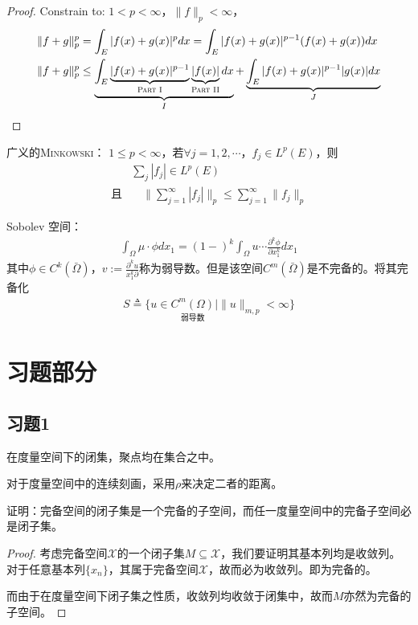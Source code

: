 \begin{proof}
    Constrain to: $1<p<\infty$，$\|f\|_p<\infty$，
    \begin{align*}
        \|f+g\|_p^p &= \int_E |f(x) + g(x)|^p dx = \int_E |f(x) + g(x)|^{p-1}(f(x) + g(x))dx \\
        \|f+g\|_p^p &\le \underbrace{\int_E \underbrace{|f(x)+g(x)|^{p-1}}\limits_{\textsc{Part I}} \underbrace{|f(x)|}\limits_{\textsc{Part II}} dx}\limits_{I} + \underbrace{\int_{E} |f(x) + g(x)|^{p-1} |g(x)| dx}\limits_{J}
    \end{align*}
\end{proof}

\begin{theorem}
    \textsc{广义的Minkowski：} $1\le p< \infty$，若$\forall j = 1, 2,\cdots$，$f_j\in L^p(E)$，则
    \begin{align*}
       &\sum\limits_{j} |f_j| \in L^p(E) \\
       \text{且} &\quad \| \sum\limits_{j=1}^{\infty} |f_j| \|_p \le \sum\limits_{j=1}^{\infty} \|f_j\|_p
    \end{align*}
\end{theorem}

\begin{example}
    Sobolev 空间：
    \begin{align*}
        \int_{\Omega} \mu\cdot \phi dx_1 = (1-)^k \int_{\Omega} u\cdots \frac{\partial^k \phi}{\partial x_1^k} dx_1
    \end{align*}
    其中$\phi\in C^k(\bar{\Omega})$，$v:= \frac{\partial^k u}{ x_1^k\partial}$称为弱导数。但是该空间$C^m(\bar{\Omega})$是不完备的。将其完备化
    \begin{align*}
        S\triangleq \{ u\in\underset{\text{弱导数}}{C^m(\Omega)} | \|u\|_{m, p} < \infty\}
    \end{align*}
\end{example}

\section{习题部分}
\subsection{习题1}
\begin{remark}
    在度量空间下的闭集，聚点均在集合之中。

    对于度量空间中的连续刻画，采用$\rho$来决定二者的距离。
\end{remark}
\begin{exercise}
    证明：完备空间的闭子集是一个完备的子空间，而任一度量空间中的完备子空间必是闭子集。
\end{exercise}
\begin{proof}
    考虑完备空间$\mathscr{X}$的一个闭子集$M\subseteq \mathscr{X}$，我们要证明其基本列均是收敛列。对于任意基本列$\{x_n\}$，其属于完备空间$\mathscr{X}$，故而必为收敛列。即为完备的。
    
    而由于在度量空间下闭子集之性质，收敛列均收敛于闭集中，故而$M$亦然为完备的子空间。
\end{proof}

